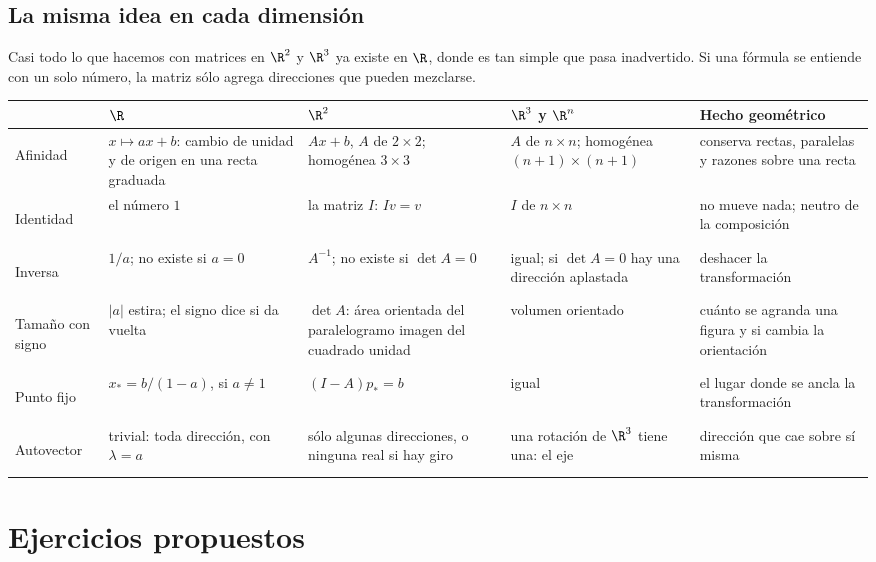 \subsection{La misma idea en cada dimensión}\label{sec:misma-idea}

Casi todo lo que hacemos con matrices en \(\R^2\) y \(\R^3\) ya existe en \(\R\), donde es tan
simple que pasa inadvertido. Si una fórmula se entiende con un solo número, la matriz sólo
agrega direcciones que pueden mezclarse.

{\small
\begin{tabularx}{\textwidth}{>{\bfseries\raggedright\arraybackslash}p{17mm}>{\raggedright\arraybackslash}p{30mm}>{\raggedright\arraybackslash}p{33mm}>{\raggedright\arraybackslash}p{30mm}Y}
\toprule
& \(\R\) & \(\R^2\) & \(\R^3\) y \(\R^n\) & Hecho geométrico\\
\midrule
Afinidad & \(x\mapsto ax+b\): cambio de unidad y de origen en una recta graduada &
\(Ax+b\), \(A\) de \(2\times2\); homogénea \(3\times3\) & \(A\) de \(n\times n\); homogénea
\((n+1)\times(n+1)\) & conserva rectas, paralelas y razones sobre una recta\\
\addlinespace
Identidad & el número \(1\) & la matriz \(I\): \(Iv=v\) & \(I\) de \(n\times n\) & no mueve
nada; neutro de la composición\\
\addlinespace
Inversa & \(1/a\); no existe si \(a=0\) & \(A^{-1}\); no existe si \(\det A=0\) & igual; si
\(\det A=0\) hay una dirección aplastada & deshacer la transformación\\
\addlinespace
Tamaño con signo & \(|a|\) estira; el signo dice si da vuelta & \(\det A\): área orientada
del paralelogramo imagen del cuadrado unidad & volumen orientado & cuánto se agranda una
figura y si cambia la orientación\\
\addlinespace
Punto fijo & \(x_\ast=b/(1-a)\), si \(a\neq1\) & \((I-A)p_\ast=b\) & igual & el lugar donde se
ancla la transformación\\
\addlinespace
Autovector & trivial: toda dirección, con \(\lambda=a\) & sólo algunas direcciones, o
ninguna real si hay giro & una rotación de \(\R^3\) tiene una: el eje & dirección que cae
sobre sí misma\\
\bottomrule
\end{tabularx}
}

\section{Ejercicios propuestos}

